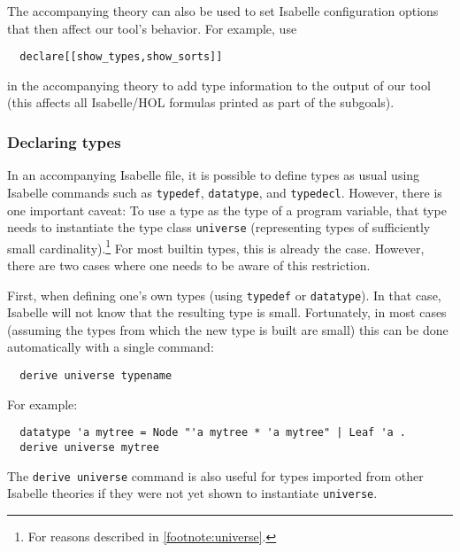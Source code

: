 \documentclass{article}
\begin{document}
The accompanying theory can also be used to set Isabelle configuration
options that then affect our tool's behavior. For example, use
\begin{lstlisting}
  declare[[show_types,show_sorts]]
\end{lstlisting}
in the accompanying theory to
add type information to the output of our tool (this affects all
Isabelle/HOL formulas printed as part of the subgoals).

\subsubsection{Declaring types}
\label{sec:deftypes}

In an accompanying Isabelle file, it is possible to define types as
usual using Isabelle commands such as \texttt{typedef},
\texttt{datatype}, and \texttt{typedecl}. However, there is one important
caveat: To use a type as the type of a program variable, that type
needs to instantiate the type class \texttt{universe} (representing
types of sufficiently small cardinality).\footnote{For reasons described in
  \autoref{footnote:universe}.} For most builtin types, this is
already the case. However, there are two cases where one needs to be
aware of this restriction.

First, when defining one's own types (using \texttt{typedef} or
\texttt{datatype}). In that case, Isabelle will not know that the
resulting type is small. Fortunately, in most cases
(assuming the types from which the new type is built are small) this
can be done automatically with a single command:
\begin{lstlisting}
  derive universe typename
\end{lstlisting}
For example:
\begin{lstlisting}
  datatype 'a mytree = Node "'a mytree * 'a mytree" | Leaf 'a .
  derive universe mytree
\end{lstlisting}
The \texttt{derive universe} command is also useful for types imported
from other Isabelle theories if they were not yet shown to instantiate
\texttt{universe}.
\end{document}

